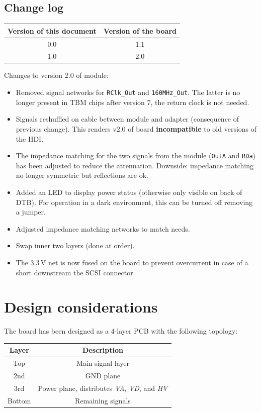 \section{Change log}
\begin{tabular}{cc}
    \toprule
    Version of this document & Version of the board \\
    \midrule
    0.0 & 1.1 \\
    1.0 & 2.0 \\
\end{tabular}

Changes to version 2.0 of module:
\begin{itemize}
    \item Removed signal networks for \texttt{RClk\_Out} and \texttt{160MHz\_Out}. The latter is no longer present in TBM chips after version 7, the return clock is not needed.
    \item Signals reshuffled on cable between module and adapter (consequence of previous change). This renders v2.0 of board \textbf{incompatible} to old versions of the HDI.
    \item The impedance matching for the two signals from the module (\texttt{OutA} and \texttt{RDa}) has been adjusted to reduce the attenuation. Downside: impedance matching no longer symmetric but reflections are ok.
    \item Added an LED to display power status (otherwise only visible on back of DTB). For operation in a dark environment, this can be turned off removing a jumper.
    \item Adjusted impedance matching networks to match needs.
    \item Swap inner two layers (done at order).
    \item The 3.3\,V net is now fused on the board to prevent overcurrent in case of a short downstream the SCSI connector.
\end{itemize}

\chapter{Design considerations}
The board has been designed as a 4-layer PCB with the following topology:
\begin{center}
\begin{tabular}{cc}
	\toprule %
Layer & Description \\
	\midrule %
Top & Main signal layer \\
2nd & GND plane \\
3rd & Power plane, distributes \emph{VA}, \emph{VD}, and \emph{HV} \\
Bottom & Remaining signals \\
	\bottomrule %
\end{tabular}
\end{center}

